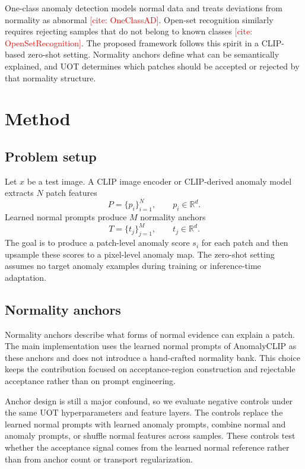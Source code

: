 \documentclass[10pt]{article}
\newcommand{\needcite}[1]{\textcolor{red}{[cite: #1]}}
\begin{document}
One-class anomaly detection models normal data and treats deviations from normality as abnormal \needcite{OneClassAD}.
Open-set recognition similarly requires rejecting samples that do not belong to known classes \needcite{OpenSetRecognition}.
The proposed framework follows this spirit in a CLIP-based zero-shot setting.
Normality anchors define what can be semantically explained, and UOT determines which patches should be accepted or rejected by that normality structure.

\section{Method}

\subsection{Problem setup}

Let $x$ be a test image.
A CLIP image encoder or CLIP-derived anomaly model extracts $N$ patch features
\begin{equation}
    P = \{p_i\}_{i=1}^{N}, \qquad p_i \in \mathbb{R}^{d}.
\end{equation}
Learned normal prompts produce $M$ normality anchors
\begin{equation}
    T = \{t_j\}_{j=1}^{M}, \qquad t_j \in \mathbb{R}^{d}.
\end{equation}
The goal is to produce a patch-level anomaly score $s_i$ for each patch and then upsample these scores to a pixel-level anomaly map.
The zero-shot setting assumes no target anomaly examples during training or inference-time adaptation.

\subsection{Normality anchors}

Normality anchors describe what forms of normal evidence can explain a patch.
The main implementation uses the learned normal prompts of AnomalyCLIP as these anchors and does not introduce a hand-crafted normality bank.
This choice keeps the contribution focused on acceptance-region construction and rejectable acceptance rather than on prompt engineering.

Anchor design is still a major confound, so we evaluate negative controls under the same UOT hyperparameters and feature layers.
The controls replace the learned normal prompts with learned anomaly prompts, combine normal and anomaly prompts, or shuffle normal features across samples.
These controls test whether the acceptance signal comes from the learned normal reference rather than from anchor count or transport regularization.
\end{document}
